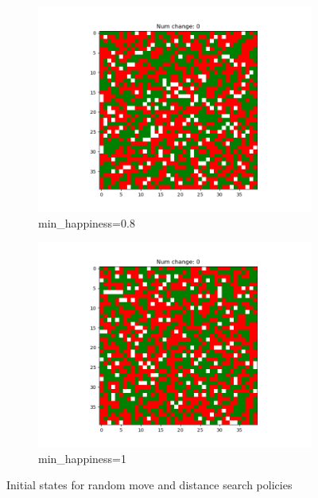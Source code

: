 \documentclass[11pt]{article}
\begin{document}
\begin{figure}[h]
		\begin{subfigure}{0.14\textwidth}
			\includegraphics[width=\linewidth]{policy4_initial_min8.png}
			\caption{\centering min_happiness=0.8}
			\label{distance_finalmin8}
		\end{subfigure}\hfill
		\begin{subfigure}{0.14\textwidth}
			\includegraphics[width=\linewidth]{policy4_initial_min1.png}
			\caption{\centering min_happiness=1}
			\label{distance_finalmin1}
		\end{subfigure}\hfill
		\caption{Initial states for random move and distance search policies}
		\label{distance_initialstate}
	\end{figure}
	\vspace{-2em} %
\end{document}
